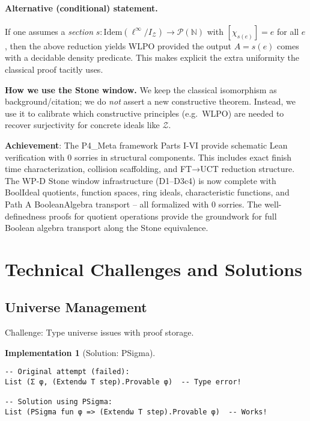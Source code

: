 \documentclass[11pt]{article}
\newif\iffullversion
\theoremstyle{definition}
\newtheorem{implementation}[theorem]{Implementation}
\theoremstyle{remark}
\begin{document}
\paragraph{Alternative (conditional) statement.}
If one assumes a \emph{section} $s:\mathrm{Idem}(\ell^\infty/I_{\mathcal Z})\to\mathcal P(\mathbb N)$
with $[\chi_{s(e)}]=e$ for all $e$, then the above reduction yields WLPO provided the output $A=s(e)$
comes with a decidable density predicate.
This makes explicit the extra uniformity the classical proof tacitly uses.

\begin{mdframed}[style=status]
\textbf{How we use the Stone window.}
We keep the classical isomorphism as background/citation; we do \emph{not} assert a new constructive theorem.
Instead, we use it to calibrate which constructive principles (e.g.\ WLPO) are needed to recover surjectivity for concrete ideals like $\mathcal Z$.
\end{mdframed}

\begin{mdframed}[style=achievement]
\textbf{Achievement}: The P4\_Meta framework Parts I-VI provide schematic Lean verification with 0 sorries in structural components. This includes exact finish time characterization, collision scaffolding, and FT→UCT reduction structure. The WP-D Stone window infrastructure (D1--D3c4) is now complete with BoolIdeal quotients, function spaces, ring ideals, characteristic functions, and Path A BooleanAlgebra transport -- all formalized with 0 sorries. The well-definedness proofs for quotient operations provide the groundwork for full Boolean algebra transport along the Stone equivalence.
\end{mdframed}
\iffullversion
\section{Technical Challenges and Solutions}

\subsection{Universe Management}

Challenge: Type universe issues with proof storage.

\begin{implementation}[Solution: PSigma]
\begin{lstlisting}[language={}]
-- Original attempt (failed):
List (Σ φ, (Extendω T step).Provable φ)  -- Type error!

-- Solution using PSigma:
List (PSigma fun φ => (Extendω T step).Provable φ)  -- Works!
\end{lstlisting}
\end{implementation}
\end{document}
